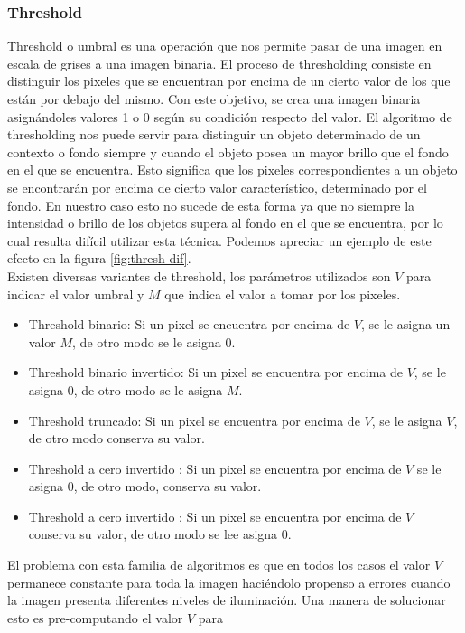 	\subsubsection{\label{sec:thresh} Threshold}
Threshold o umbral es una operación que nos permite pasar de una 
imagen en escala de grises a una imagen binaria. El proceso de 
thresholding consiste en distinguir los pixeles que se encuentran por 
encima de un cierto valor de los que están por debajo del mismo. Con este objetivo, se crea una imagen binaria asignándoles valores 1 o 0 según su condición respecto del valor. El algoritmo de thresholding nos puede servir para distinguir un objeto determinado de un contexto o fondo siempre y cuando el objeto posea un mayor brillo que el fondo en el que se encuentra. Esto significa que los pixeles correspondientes a un objeto se encontrarán por encima de cierto valor característico, determinado por el fondo. En nuestro caso esto no sucede de esta forma ya que no siempre la intensidad o brillo de los objetos supera al fondo en el que se encuentra, por lo cual resulta difícil utilizar esta técnica. Podemos apreciar un ejemplo de este efecto en la figura \ref{fig:thresh-dif}. \\
\indent Existen diversas variantes de threshold, los parámetros 
utilizados son $V$ para indicar el valor umbral y $M$ que indica el 
valor a tomar por los pixeles.
\begin{itemize}
\item{ Threshold binario:  Si un pixel se encuentra por encima de $V$, se le asigna un valor $M$, de otro modo se le asigna $0$.}
\item{ Threshold binario invertido:  Si un pixel se encuentra por encima de $V$, se le asigna 0, de otro modo se le asigna $M$.}
\item{ Threshold truncado:  Si un pixel se encuentra por encima de $V$, se le asigna $V$, de otro modo conserva su valor.}
\item{ Threshold a cero invertido : Si un pixel se encuentra por encima de $V$ se le asigna $0$, de otro modo, conserva su valor.}
\item{ Threshold a cero invertido : Si un pixel se encuentra por encima de $V$ conserva su valor, de otro modo se lee asigna $0$.}
\end{itemize}
El problema con esta familia de algoritmos es que en todos los casos el 
valor $V$ permanece constante para toda la imagen haciéndolo propenso 
a errores cuando la imagen presenta diferentes niveles de iluminación. 
Una manera de solucionar esto es pre-computando el valor $V$ para 
